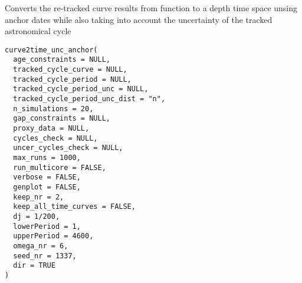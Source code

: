 \documentclass[a4paper]{book}
\begin{document}
%
\begin{Description}
Converts the re-tracked curve results from
 function to a depth time space unsing anchor dates
while also taking into account the uncertainty of the tracked astronomical cycle
\end{Description}
%
\begin{Usage}
\begin{verbatim}
curve2time_unc_anchor(
  age_constraints = NULL,
  tracked_cycle_curve = NULL,
  tracked_cycle_period = NULL,
  tracked_cycle_period_unc = NULL,
  tracked_cycle_period_unc_dist = "n",
  n_simulations = 20,
  gap_constraints = NULL,
  proxy_data = NULL,
  cycles_check = NULL,
  uncer_cycles_check = NULL,
  max_runs = 1000,
  run_multicore = FALSE,
  verbose = FALSE,
  genplot = FALSE,
  keep_nr = 2,
  keep_all_time_curves = FALSE,
  dj = 1/200,
  lowerPeriod = 1,
  upperPeriod = 4600,
  omega_nr = 6,
  seed_nr = 1337,
  dir = TRUE
)
\end{verbatim}
\end{Usage}
%
\end{document}
